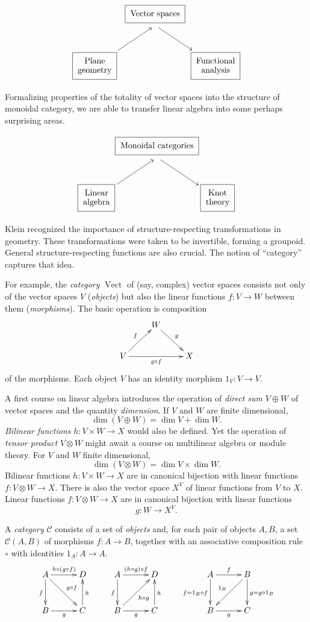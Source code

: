 \documentclass[a4paper,12pt]{article}
\theoremstyle{definition}
\theoremstyle{fact}
\theoremstyle{genquest}
\theoremstyle{step}
\newcommand{\catC}{\mathcal{C}}
\newcommand{\Vect}{\operatorname{Vect}}
\newcommand{\longto}{\longrightarrow}
\begin{document}
\[
\xygraph{ !{\UseTips}
 !{/r6pc/: /u4pc/::}
 []*++[F-]+!C\txt{Vector spaces} !{+D*+!C\txt{ \ }} 
 ( [dl] *++[F-]+\txt{Plane\\geometry} : ?
 , ? : [dr] *++[F-]+\txt{Functional\\analysis}
 )
}\]

\noindent Formalizing properties of the totality of vector spaces into the structure of monoidal category, we are able to transfer linear algebra into some perhaps surprising areas.

\[
\xygraph{  !{\UseTips}!{/u4pc/::}
 !{/r6pc/: /u4pc/::}
 []*++[F-]+!C\txt{Monoidal categories} !{+D*+!C\txt{ \ }} 
 ( [dl] *++[F-]+\txt{Linear\\algebra} : ?
 , ? : [dr] *++[F-]+\txt{Knot\\theory}
 )
}\]

Klein recognized the importance of structure-respecting transformations in geometry.
These transformations were taken to be invertible, forming a groupoid.
General structure-respecting functions are also crucial.
The notion of ``category'' captures that idea.

For example, the \emph{category} $\Vect $ of (say, complex) vector spaces consists not only of the vector spaces $V$ (\emph{objects}) but also the linear functions $f:V\to W$ between them (\emph{morphisms}).
The basic operation is composition
 $$
 \xymatrix{ & W \ar[dr]^g &
                \\ V \ar[ur]^f  \ar[rr]_{g\circ f} & & X
                }
 $$ 
of the morphisms.
Each object $V$ has an identity morphism $1_V : V \longto V$.

A first course on linear algebra introduces the operation of \emph{direct sum} $V \oplus W$ of vector spaces and the quantity \emph{dimension}. If $V$ and $W$ are finite dimensional,
\[
\dim (V \oplus W) = \dim V + \dim W.
\]
\emph{Bilinear functions} $h : V \times W \longto X$ would also be defined.
Yet the operation of \emph{tensor product}   $V \otimes W$ might await a course on multilinear algebra or module theory.
For $V$ and $W$ finite dimensional, 
\[
\dim (V \otimes W) = \dim V \times \dim W.
\]
Bilinear functions $h : V \times W \longto X$ are in canonical bijection with linear functions $f : V \otimes W \longto X$.
There is also the vector space $X^V$ of linear functions from $V$ to $X$.
Linear functions $f : V \otimes W  \longto X$ are in canonical bijection with linear functions
\[
g : W  \longto X^V.
\]


A \emph{category}  $\catC$ consists of a set of \emph{objects} and, for each pair of objects $A, B$, a set $\catC (A,B)$ of morphisms $f : A  \longto B$, together with an associative composition rule $\circ$ with identities $1_A : A  \longto A$.
\[  \xymatrix@R+2mm @C+2mm{
    A \ar[r]^{h \circ (g\circ f)} \ar[d]_f \ar[rd]^{g \circ f} & D   \\
    B \ar[r]_g    & C \ar[u]_h
  } \qquad
  \xymatrix@R+2mm @C+2mm{
    A \ar[r]^{(h \circ g)\circ f} \ar[d]_f  & D   \\
    B \ar[r]_g  \ar[ru]_{h \circ g}  & C \ar[u]_h}
 \qquad
   \xymatrix@R+2mm @C+2mm{
    A \ar[r]^f\ar[d]_{f=1_B \circ f}   & B \ar[ld]_{1_B}  \ar[d]^{g=g\circ 1_B}\\
    B \ar[r]_g     & C }
\]
\end{document}
